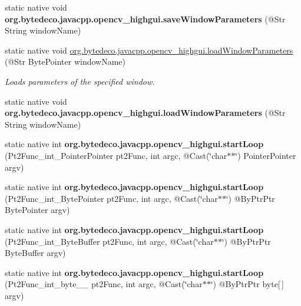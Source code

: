 \begin{DoxyCompactItemize}
\mbox{\label{group__highgui__qt_ga3b3585f169dac5b0ba26be6af784a3f5}} 
static native void {\bfseries org.\+bytedeco.\+javacpp.\+opencv\+\_\+highgui.\+save\+Window\+Parameters} (@Str String window\+Name)
\item 
static native void \hyperlink{group__highgui__qt_gacabd2c2030cc1e76d6537ecf12821fbf}{org.\+bytedeco.\+javacpp.\+opencv\+\_\+highgui.\+load\+Window\+Parameters} (@Str Byte\+Pointer window\+Name)
\begin{DoxyCompactList}\small\item\em Loads parameters of the specified window. \end{DoxyCompactList}\item 
\mbox{\label{group__highgui__qt_ga3b5a096303ffca93f942bf24de2ad665}} 
static native void {\bfseries org.\+bytedeco.\+javacpp.\+opencv\+\_\+highgui.\+load\+Window\+Parameters} (@Str String window\+Name)
\item 
\mbox{\label{group__highgui__qt_gad7d1b869550f84a15b2e2bf385f047c2}} 
static native int {\bfseries org.\+bytedeco.\+javacpp.\+opencv\+\_\+highgui.\+start\+Loop} (Pt2\+Func\+\_\+int\+\_\+\+Pointer\+Pointer pt2\+Func, int argc, @Cast(\char`\"{}char$\ast$$\ast$\char`\"{}) Pointer\+Pointer argv)
\item 
\mbox{\label{group__highgui__qt_ga362290a25b9e52b6fc7cc2d2484fd9db}} 
static native int {\bfseries org.\+bytedeco.\+javacpp.\+opencv\+\_\+highgui.\+start\+Loop} (Pt2\+Func\+\_\+int\+\_\+\+Byte\+Pointer pt2\+Func, int argc, @Cast(\char`\"{}char$\ast$$\ast$\char`\"{}) @By\+Ptr\+Ptr Byte\+Pointer argv)
\item 
\mbox{\label{group__highgui__qt_gac51f98fe25af1f453f94bd08e01901ea}} 
static native int {\bfseries org.\+bytedeco.\+javacpp.\+opencv\+\_\+highgui.\+start\+Loop} (Pt2\+Func\+\_\+int\+\_\+\+Byte\+Buffer pt2\+Func, int argc, @Cast(\char`\"{}char$\ast$$\ast$\char`\"{}) @By\+Ptr\+Ptr Byte\+Buffer argv)
\item 
\mbox{\label{group__highgui__qt_ga9438c115fcf7970fb5c8595dacc3844b}} 
static native int {\bfseries org.\+bytedeco.\+javacpp.\+opencv\+\_\+highgui.\+start\+Loop} (Pt2\+Func\+\_\+int\+\_\+byte\+\_\+\+\_\+ pt2\+Func, int argc, @Cast(\char`\"{}char$\ast$$\ast$\char`\"{}) @By\+Ptr\+Ptr byte\mbox{[}$\,$\mbox{]} argv)

\end{DoxyCompactItemize}
